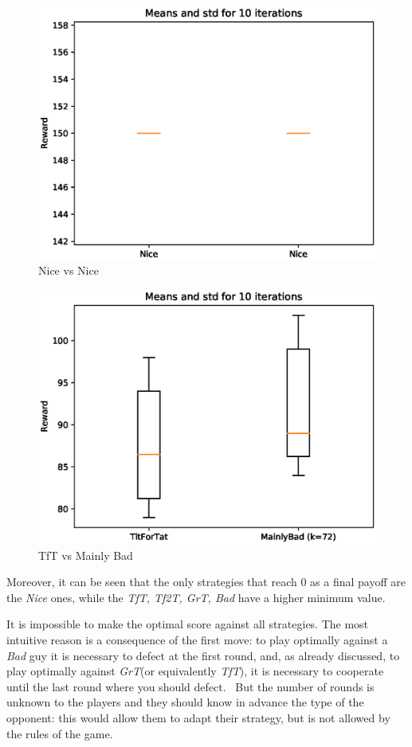 \documentclass[journal,10pt,twoside]{IEEEtran}
\begin{document}
\begin{figure}[!ht]
    \centering
    \includegraphics[width=.7\columnwidth]{../img/ipd2p/ipd2p-boxplot-Nice-Nice}
    \caption{Nice vs Nice}
    \label{fig:boxnn}
\end{figure}

\begin{figure}[!ht]
    \centering
    \includegraphics[width=.7\columnwidth]{../img/ipd2p/ipd2p-boxplot-TitForTat-MainlyBad(k=72)}
    \caption{TfT vs Mainly Bad}
    \label{fig:boxmbvtft}
\end{figure}

Moreover, it can be seen that the only strategies that reach $0$ as a final payoff are the \textit{Nice} ones, while the \textit{TfT, Tf2T, GrT, Bad} have a higher minimum value.

It is impossible to make the optimal score against all strategies. The most intuitive reason is a consequence of the first move: to play optimally against a \textit{Bad} guy it is necessary to defect at the first round, and, as already discussed, to play optimally against \textit{GrT}(or equivalently \textit{TfT}), it is necessary to cooperate until the last round where you should defect.~\cite{mathieu2017}
But the number of rounds is unknown to the players and they should know in advance the type of the opponent: this would allow them to adapt their strategy, but is not allowed by the rules of the game. 
\end{document}
